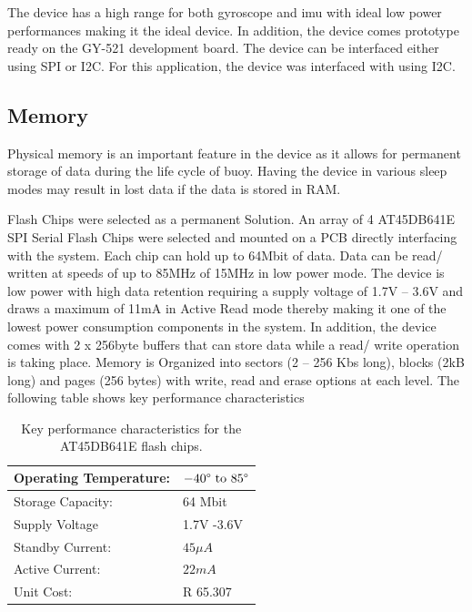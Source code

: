 The device has a high range for both gyroscope and imu with ideal low power performances making it the ideal device. In addition, the device comes prototype ready on the GY-521 development board. The device can be interfaced either using SPI or I2C. For this application, the device was interfaced with using I2C.

\subsection{Memory}

Physical memory is an important feature in the device as it allows for permanent storage of data during the life cycle of buoy. Having the device in various sleep modes may result in lost data if the data is stored in RAM.

Flash Chips were selected as a permanent Solution. An array of 4 AT45DB641E SPI Serial Flash Chips were selected and mounted on a PCB directly interfacing with the system. Each chip can hold up to 64Mbit of data. Data can be read/ written at speeds of up to 85MHz of 15MHz in low power mode. The device is low power with high data retention requiring a supply voltage of 1.7V – 3.6V and draws a maximum of 11mA in Active Read mode thereby making it one of the lowest power consumption components in the system. In addition, the device comes with 2 x 256byte buffers that can store data while a read/ write operation is taking place. Memory is Organized into sectors (2 – 256 Kbs long), blocks (2kB long) and pages (256 bytes) with write, read and erase options at each level. The following table shows key performance characteristics

\begin{table}[H]
    \centering
    \caption{Key performance characteristics for the AT45DB641E flash chips.}
    \begin{tabular}{|l|l|}
    \hline
    Operating Temperature:  & $ -40\degree \text{ to }85 \degree$ \\
    \hline
    Storage Capacity: & 64 Mbit \\
    \hline
    Supply Voltage    & 1.7V -3.6V\\
    \hline
     Standby Current: & $45\mu A$ \\
     \hline
     Active Current:  & $22mA$ \\
     \hline
     Unit Cost:       & R 65.307 \footnotemark\\
     \hline
    \end{tabular}
    
    \label{tab:flash_specs}
\end{table}

